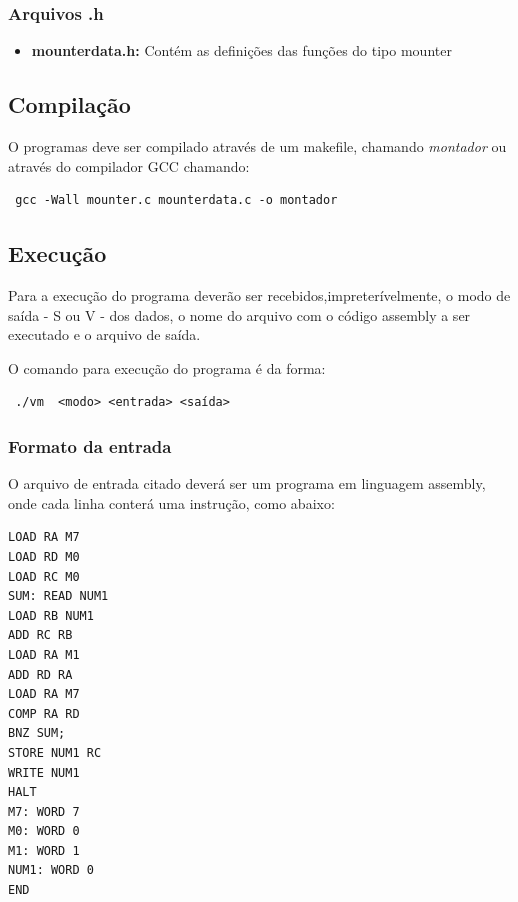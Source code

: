 \documentclass[12pt]{article}
\begin{document}
\subsubsection{Arquivos .h}

\begin{itemize}
\item \textbf{mounterdata.h:} Contém as definições das funções do tipo mounter
\end{itemize}

\subsection{Compilação}

O programas deve ser compilado através de um makefile, chamando
\textit{montador}
ou através do compilador GCC chamando:\\

\begin{footnotesize}
\begin{verbatim} gcc -Wall mounter.c mounterdata.c -o montador \end{verbatim}
\end{footnotesize}

\subsection{Execução}

Para a execução do programa deverão ser recebidos,impreterívelmente, 
o modo de saída - S ou V - dos dados, o nome do arquivo com o código assembly a ser
executado e o arquivo de saída.

O comando para execução do programa é da forma: \\

\begin{footnotesize}
\begin{verbatim} ./vm  <modo> <entrada> <saída> \end{verbatim}
\end{footnotesize}

\subsubsection{Formato da entrada}
O arquivo de entrada citado deverá ser um programa em linguagem assembly,
onde cada linha conterá uma instrução, como abaixo:

\begin{footnotesize}
\begin{verbatim}
LOAD RA M7
LOAD RD M0
LOAD RC M0
SUM: READ NUM1
LOAD RB NUM1
ADD RC RB 
LOAD RA M1
ADD RD RA
LOAD RA M7
COMP RA RD
BNZ SUM;
STORE NUM1 RC
WRITE NUM1
HALT
M7: WORD 7
M0: WORD 0
M1: WORD 1
NUM1: WORD 0
END
\end{verbatim}
\end{footnotesize}
\end{document}
